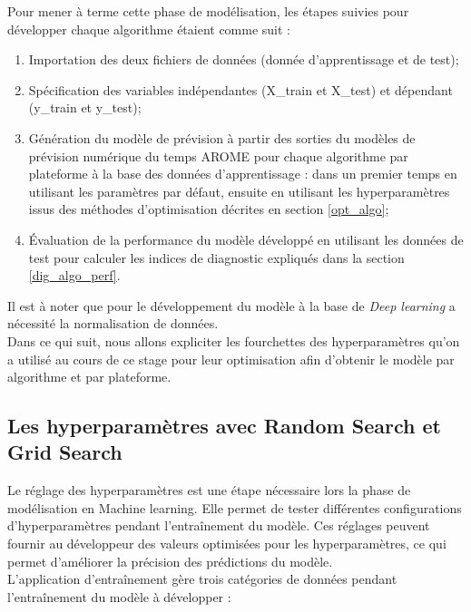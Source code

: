 Pour mener à terme cette phase de modélisation, les étapes suivies pour développer chaque algorithme étaient comme suit :
\begin{enumerate}
    \item Importation des deux fichiers de données (donnée d'apprentissage et de test);
    \item Spécification des variables indépendantes (X\_train et X\_test)  et dépendant (y\_train et y\_test);
    \item Génération du modèle de prévision à partir des sorties du modèles de prévision numérique du temps AROME pour chaque algorithme par plateforme à la base des données d'apprentissage : dans un premier temps en utilisant les paramètres par défaut, ensuite en utilisant les hyperparamètres issus des méthodes d'optimisation décrites en section \ref{opt_algo};
    \item Évaluation de la performance du modèle développé en utilisant les données de test pour calculer les indices de diagnostic expliqués dans la section \ref{dig_algo_perf}.\\
\end{enumerate}

Il est à noter que pour le développement du modèle à la base de \textit{Deep learning} a nécessité la normalisation de données.\\

Dans ce qui suit, nous allons expliciter les fourchettes des hyperparamètres qu'on a utilisé au cours de ce stage pour leur optimisation afin d'obtenir le modèle par algorithme et par plateforme.\\

\subsection*{Les hyperparamètres avec Random Search et Grid Search}\label{hyper_param}

Le réglage des hyperparamètres est une étape nécessaire lors la phase de modélisation en Machine learning. Elle permet de tester différentes configurations d'hyperparamètres pendant l'entraînement du modèle. Ces réglages peuvent fournir au développeur des valeurs optimisées pour les hyperparamètres, ce qui permet d'améliorer la précision des prédictions du modèle.\\

L'application d'entraînement gère trois catégories de données pendant l'entraînement du modèle à développer :

